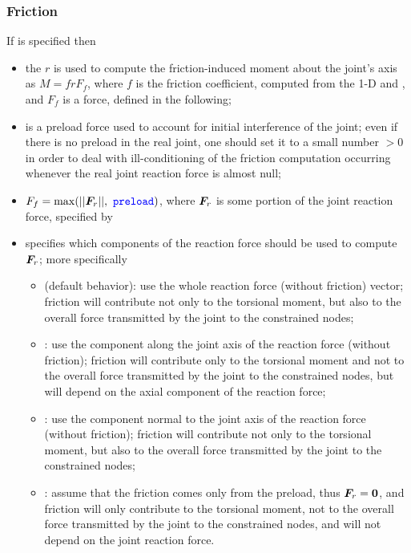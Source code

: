 \subsubsection{Friction}
If  is specified then
\begin{itemize}
\item the  $r$ is used to compute the friction-induced moment about the joint's axis as $M = frF_f$, where $f$ is the friction coefficient, computed from the 1-D  and , and $F_f$ is a force, defined in the following;
\item {} is a preload force used to account for initial interference of the joint; even if there is no preload
in the real joint, one should set it to a small number $> 0$  in order to deal with ill-conditioning of the friction computation occurring whenever the real joint reaction force is almost null;
\item $F_f=\max(||\T{F}_r||,\ \nt{preload})$, where $\boldsymbol{F}_r$ is some portion of the joint reaction force, %
specified by 
\item {} specifies which components of the reaction force should be used to compute $\boldsymbol{F}_r$; more specifically
    \begin{itemize}
        \item {} (default behavior): use the whole reaction force (without friction) vector; friction will contribute not only to the torsional moment, but also to the overall force transmitted by the joint to the constrained nodes;
        \item {}: use the component along the joint axis of the reaction force (without friction); friction will contribute only to the torsional moment and not to the overall force transmitted by the joint to the constrained nodes, but will depend on the axial component of the reaction force;
        \item {}: use the component normal to the joint axis of the reaction force (without friction); friction will contribute not only to the torsional moment, but also to the overall force transmitted by the joint to the constrained nodes;
        \item {}: assume that the friction comes only from the preload, thus $\boldsymbol{F}_r=\boldsymbol{0}$, and friction will only contribute to the torsional moment, not to the overall force transmitted by the joint to the constrained nodes, and will not depend on the joint reaction force.
    \end{itemize}

\end{itemize}

